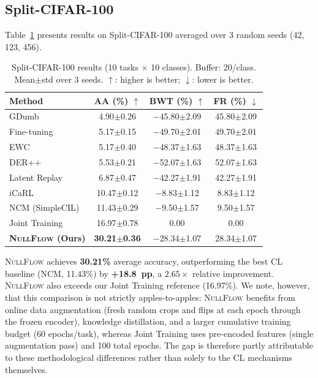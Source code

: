\documentclass[10pt,twocolumn,letterpaper]{article}
\newcommand{\best}[1]{\textbf{\textcolor{bestcolor}{#1}}}
\newcommand{\second}[1]{\textcolor{secondcolor}{#1}}
\newcommand{\ours}{\textsc{NullFlow}}
\begin{document}
\subsection{Split-CIFAR-100}

Table~\ref{tab:cifar100} presents results on Split-CIFAR-100 averaged over 3 random seeds (42, 123, 456).

\begin{table}[!t]
\centering
\caption{Split-CIFAR-100 results (10 tasks $\times$ 10 classes). Buffer: 20/class. Mean$\pm$std over 3 seeds. $\uparrow$: higher is better; $\downarrow$: lower is better.}
\label{tab:cifar100}
\setlength{\tabcolsep}{3pt}
\footnotesize
\begin{tabular}{@{}lccc@{}}
\toprule
\textbf{Method} & \textbf{AA (\%) $\uparrow$} & \textbf{BWT (\%) $\uparrow$} & \textbf{FR (\%) $\downarrow$} \\
\midrule
GDumb              & 4.90$\pm$0.26  & $-$45.80$\pm$2.09 & 45.80$\pm$2.09 \\
Fine-tuning        & 5.17$\pm$0.15  & $-$49.70$\pm$2.01 & 49.70$\pm$2.01 \\
EWC                & 5.17$\pm$0.40  & $-$48.37$\pm$1.63 & 48.37$\pm$1.63 \\
DER++              & 5.53$\pm$0.21  & $-$52.07$\pm$1.63 & 52.07$\pm$1.63 \\
Latent Replay      & 6.87$\pm$0.47  & $-$42.27$\pm$1.91 & 42.27$\pm$1.91 \\
iCaRL              & 10.47$\pm$0.12 & $-$8.83$\pm$1.12  & 8.83$\pm$1.12 \\
NCM (SimpleCIL)    & \second{11.43$\pm$0.29} & $-$9.50$\pm$1.57  & 9.50$\pm$1.57 \\
\midrule
Joint Training       & 16.97$\pm$0.78 & 0.00              & 0.00 \\
\midrule
\textbf{\ours{} (Ours)} & \best{30.21$\pm$0.36} & $-$28.34$\pm$1.07 & 28.34$\pm$1.07 \\
\bottomrule
\end{tabular}
\end{table}

\ours{} achieves \textbf{30.21\%} average accuracy, outperforming the best CL baseline (NCM, 11.43\%) by \textbf{+18.8~pp}, a $2.65\times$ relative improvement. \ours{} also exceeds our Joint Training reference (16.97\%). We note, however, that this comparison is not strictly apples-to-apples: \ours{} benefits from online data augmentation (fresh random crops and flips at each epoch through the frozen encoder), knowledge distillation, and a larger cumulative training budget (60 epochs/task), whereas Joint Training uses pre-encoded features (single augmentation pass) and 100 total epochs. The gap is therefore partly attributable to these methodological differences rather than solely to the CL mechanisms themselves.
\end{document}
